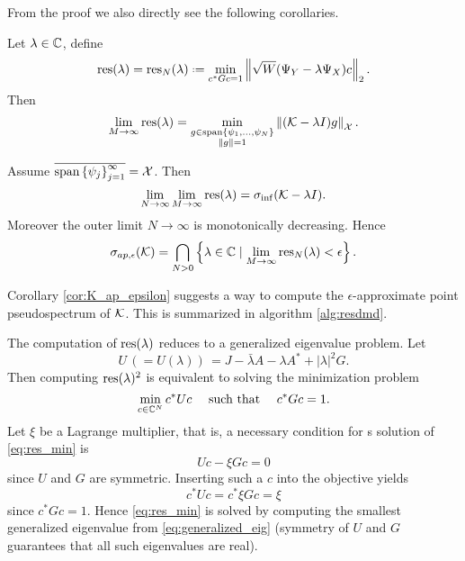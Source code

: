From the proof we also directly see the following corollaries.

\begin{corollary}
    Let $\lambda \in \mathbb{C}$, define
    \begin{equation}
        \res (\lambda) = \res_N (\lambda) 
        \defeq \min_{c^* G c = 1} \left\| \sqrt{W} ( \YY - \lambda \YX ) c \right\|_2 . 
    \end{equation} 
    Then
    \begin{equation}
        \lim_{M \to \infty} \text{res} (\lambda)
        = \min_{\substack{g \in \text{span} \left\{ \psi_1, \ldots, \psi_N \right\} \\ \| g \| = 1}}
            \left\| ( \mathcal{K} - \lambda I ) g \right\|_{\mathcal{X}} . 
    \end{equation}
\end{corollary}

\begin{corollary}
    \label{cor:K_ap_epsilon}
    Assume $\overline{\text{span} \left\{ \psi_j \right\}_{j=1}^\infty} = \mathcal{X}$. Then
    \begin{equation}
        \lim_{N \to \infty} \lim_{M \to \infty} \text{res} (\lambda) 
        = \sigma_{\inf} (\mathcal{K} - \lambda I) . 
    \end{equation}
    Moreover the outer limit $N \to \infty$ is monotonically decreasing. Hence
    \begin{equation}
        \sigma_{ap, \epsilon} (\mathcal{K}) = 
        \bigcap_{N > 0} \left\{ \lambda \in \mathbb{C} \mid 
        \lim_{M \to \infty} \text{res}_N (\lambda) < \epsilon \right\} . 
    \end{equation}
\end{corollary}

Corollary \ref{cor:K_ap_epsilon} suggests a way to compute the $\epsilon$-approximate 
point pseudospectrum of $\mathcal{K}$. This is summarized in algorithm \ref{alg:resdmd}. 

The computation of $\text{res} (\lambda)$ reduces to a generalized eigenvalue problem. Let 
\begin{equation}
    U \,( = U(\lambda) )\, = J - \bar{\lambda} A - \lambda A^* + | \lambda |^2 G . 
\end{equation}
Then computing $\text{res} (\lambda)^2$ is equivalent to solving the minimization problem 
\begin{equation}
    \label{eq:res_min}
    \min_{c \in \mathbb{C}^N} c^* U c \quad \text{ such that } \quad c^* G c = 1 .  
\end{equation}
Let $\xi$ be a Lagrange multiplier, that is, a necessary condition for s solution of 
\ref{eq:res_min} is 
\begin{equation}
    \label{eq:generalized_eig}
    U c - \xi G c = 0 
\end{equation}
since $U$ and $G$ are symmetric. Inserting such a $c$ into the objective yields 
\begin{equation}
    c^* U c = c^* \xi G c = \xi
\end{equation}
since $c^* G c = 1$. Hence \ref{eq:res_min} is solved by computing the smallest 
generalized eigenvalue from \ref{eq:generalized_eig} (symmetry of $U$ and $G$ 
guarantees that all such eigenvalues are real). 

